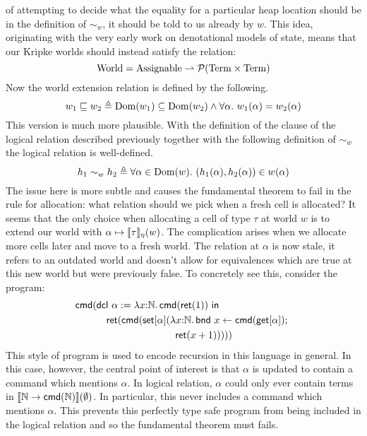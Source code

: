 of attempting to decide what the equality for a particular heap
location should be in the definition of $\sim_w$, it should be told to
us already by $w$. This idea, originating with the very early work on
denotational models of state, means that our Kripke worlds should
instead satisfy the relation:
\[
  \mathrm{World} = \mathrm{Assignable} \rightharpoonup \mathcal{P}(\mathrm{Term} \times \mathrm{Term})
\]
Now the world extension relation is defined by the following.
\[
  w_1 \mathrel{\sqsubseteq} w_2 \triangleq
  \operatorname{Dom}(w_1) \subseteq \operatorname{Dom}(w_2) \land
  \forall \alpha.\ w_1(\alpha) = w_2(\alpha)
\]
This version is much more plausible. With the definition of the clause
of the logical relation described previously together with the
following definition of $\sim_w$ the logical relation is well-defined.
\[
  h_1 \sim_w h_2 \triangleq \forall \alpha \in \operatorname{Dom}(w).
  \  (h_1(\alpha), h_2(\alpha)) \in w(\alpha)
\]
The issue here is more subtle and causes the fundamental theorem to
fail in the rule for allocation: what relation should we pick when a
fresh cell is allocated? It seems that the only choice when allocating
a cell of type $\tau$ at world $w$ is to extend our world with
$\alpha \mapsto \llbracket \tau \rrbracket_\eta(w)$. The complication arises when we
allocate more cells later and move to a fresh world. The relation at
$\alpha$ is now stale, it refers to an outdated world and doesn't
allow for equivalences which are true at this new world but were
previously false. To concretely see this, consider the program:
\begin{align*}
  \cmd{
    &\dcl{\alpha}{\lam{x}{\nat}{\cmd{\ret{1}}}}{\\
      &\quad \ret{\cmd{\set{\alpha}{\lam{x}{\nat}{
          \bnd{x}{\cmd{\get{\alpha}}}{\\ & \qquad\qquad\qquad\qquad\ret{x + 1}}
        }}}}
    }
  }
\end{align*}
This style of program is used to encode recursion in this language in
general. In this case, however, the central point of interest is that
$\alpha$ is updated to contain a command which mentions $\alpha$. In
logical relation, $\alpha$ could only ever contain terms in
$\llbracket \mathbb{N} \to \mathsf{cmd}(\mathbb{N}) \rrbracket(\emptyset)$. In particular, this never
includes a command which mentions $\alpha$. This prevents this
perfectly type safe program from being included in the logical
relation and so the fundamental theorem must fails.


